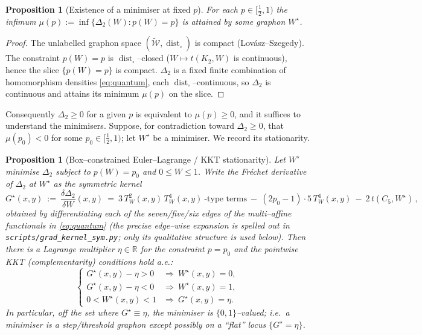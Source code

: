 \documentclass[11pt]{article}
\newtheorem{proposition}[theorem]{Proposition}
\theoremstyle{definition}
\newcommand{\R}{\mathbb R}
\newcommand{\dist}{\operatorname{dist}}
\newcommand{\tw}{T_W}
\begin{document}
\begin{proposition}[Existence of a minimiser at fixed $p$]\label{prop:minimiser}
For each $p\in[\tfrac12,1)$ the infimum
$\mu(p):=\inf\{\Delta_2(W):p(W)=p\}$ is attained by some graphon $W^\star$.
\end{proposition}

\begin{proof}
The unlabelled graphon space $(\widetilde{\mathcal W},\dist_\square)$ is compact
(Lov\'asz--Szegedy).  The constraint $p(W)=p$ is $\dist_\square$--closed
($W\mapsto t(K_2,W)$ is continuous), hence the slice $\{p(W)=p\}$ is compact.
$\Delta_2$ is a fixed finite combination of homomorphism densities
\eqref{eq:quantum}, each $\dist_\square$--continuous, so $\Delta_2$ is continuous
and attains its minimum $\mu(p)$ on the slice.
\end{proof}

Consequently $\Delta_2\ge0$ for a given $p$ is equivalent to $\mu(p)\ge0$, and it
suffices to understand the minimisers.  Suppose, for contradiction toward
$\Delta_2\ge0$, that $\mu(p_0)<0$ for some $p_0\in[\tfrac12,1)$; let $W^\star$ be a
minimiser.  We record its stationarity.

\begin{proposition}[Box--constrained Euler--Lagrange / KKT stationarity]\label{prop:kkt}
Let $W^\star$ minimise $\Delta_2$ subject to $p(W)=p_0$ and $0\le W\le1$.  Write the
Fr\'echet derivative of $\Delta_2$ at $W^\star$ as the symmetric kernel
\[
  G^\star(x,y)\ :=\ \frac{\delta\Delta_2}{\delta W}(x,y)
  \ =\ 3\,\tw^2(x,y)\,\tw^4(x,y)\ \text{-type terms}\ -\ (2p_0-1)\cdot5\,\tw^4(x,y)
     \ -\ 2\,t(C_5,W^\star)\,,
\]
obtained by differentiating each of the seven/five/six edges of the multi--affine
functionals in \eqref{eq:quantum} (the precise edge--wise expansion is spelled out
in \texttt{scripts/grad\_kernel\_sym.py}; only its qualitative structure is used
below).  Then there is a Lagrange multiplier $\eta\in\R$ for the constraint
$p=p_0$ and the pointwise KKT (complementarity) conditions hold a.e.:
\begin{equation}\label{eq:kkt}
  \begin{cases}
    G^\star(x,y)-\eta>0 &\Rightarrow\ W^\star(x,y)=0,\\
    G^\star(x,y)-\eta<0 &\Rightarrow\ W^\star(x,y)=1,\\
    0<W^\star(x,y)<1 &\Rightarrow\ G^\star(x,y)=\eta .
  \end{cases}
\end{equation}
In particular, off the set where $G^\star\equiv\eta$, the minimiser is
$\{0,1\}$--valued; i.e.\ a minimiser is a \emph{step/threshold} graphon except
possibly on a ``flat'' locus $\{G^\star=\eta\}$.
\end{proposition}
\end{document}
